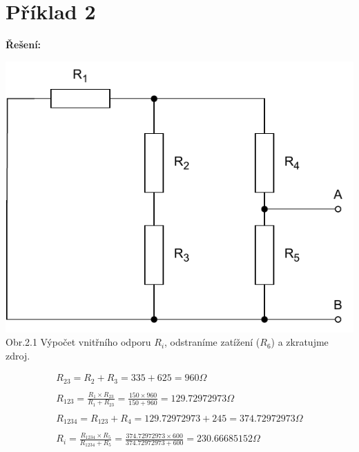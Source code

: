 \section{Příklad 2}

\large{\textbf{Řešení:}}

\begin{center}
    \includegraphics[scale=0.8,keepaspectratio]{fig/solutions/02-sol/02-step1.pdf} \\
    Obr.2.1 Výpočet vnitřního odporu $R_i$, odstraníme zatížení ($R_6$) a zkratujme zdroj.
\end{center}

\begin{gather*}
    R_{23} = R_2 + R_3 = 335 + 625 = 960 \Omega \\\\
    R_{123} = \frac{R_1 \times R_{23}}{R_1 + R_{23}} =
    \frac{150 \times 960}{150 + 960} =
    129.72972973 \Omega \\\\
    R_{1234} = R_{123} + R_4 = 129.72972973 + 245 = 374.72972973 \Omega \\\\
    R_i = \frac{R_{1234} \times R_5}{R_{1234} + R_5} =
    \frac{374.72972973 \times 600}{374.72972973 + 600} =
    230.66685152 \Omega
\end{gather*}

\newpage

